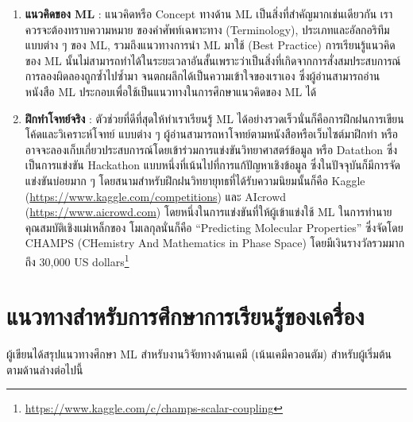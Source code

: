 \begin{enumerate}
    \item \textbf{แนวคิดของ ML} : แนวคิดหรือ Concept ทางด้าน ML เป็นสิ่งที่สำคัญมากเช่นเดียวกัน เราควรจะต้องทราบความหมาย%
    ของคำศัพท์เฉพาะทาง (Terminology), ประเภทและอัลกอริทึมแบบต่าง ๆ ของ ML, รวมถึงแนวทางการนำ ML มาใช้ (Best Practice)
    การเรียนรู้แนวคิดของ ML นั้นไม่สามารถทำได้ในระยะเวลาอันสั้นเพราะว่าเป็นสิ่งที่เกิดจากการสั่งสมประสบการณ์ การลองผิดลองถูกซ้ำไปซ้ำมา%
    จนตกผลึกได้เป็นความเข้าใจของเราเอง ซึ่งผู้อ่านสามารถอ่านหนังสือ ML ประกอบเพื่อใช้เป็นแนวทางในการศึกษาแนวคิดของ ML ได้
    
    \item \textbf{ฝึกทำโจทย์จริง} : ตัวช่วยที่ดีที่สุดให้ทำเราเรียนรู้ ML ได้อย่างรวดเร็วนั่นก็คือการฝึกฝนการเขียนโค้ดและวิเคราะห์โจทย์%
    แบบต่าง ๆ ผู้อ่านสามารถหาโจทย์ตามหนังสือหรือเว็บไซต์มาฝึกทำ หรืออาจจะลองเก็บเกี่ยวประสบการณ์โดยเข้าร่วมการแข่งขันวิทยาศาสตร์ข้อมูล 
    หรือ Datathon ซึ่งเป็นการแข่งขัน Hackathon แบบหนึ่งที่เน้นไปที่การแก้ปัญหาเชิงข้อมูล ซึ่งในปัจจุบันก็มีการจัดแข่งขันบ่อยมาก ๆ 
    โดยสนามสำหรับฝึกฝนวิทยายุทธที่ได้รับความนิยมนั้นก็คือ Kaggle (\url{https://www.kaggle.com/competitions}) และ
    AIcrowd (\url{https://www.aicrowd.com}) โดยหนึ่งในการแข่งขันที่ให้ผู้เข้าแข่งใช้ ML ในการทำนายคุณสมบัติเชิงแม่เหล็กของ%
    โมเลกุลนั่นก็คือ \enquote{Predicting Molecular Properties} ซึ่งจัดโดย CHAMPS (CHemistry And Mathematics in Phase 
    Space) โดยมีเงินรางวัลรวมมากถึง 30,000 US dollars\footnote{\url{https://www.kaggle.com/c/champs-scalar-coupling}}
\end{enumerate}

\section{แนวทางสำหรับการศึกษาการเรียนรู้ของเครื่อง}
\label{sec:learn_ml}

ผู้เขียนได้สรุปแนวทางศึกษา ML สำหรับงานวิจัยทางด้านเคมี (เน้นเคมีควอนตัม) สำหรับผู้เริ่มต้นตามด้านล่างต่อไปนี้


